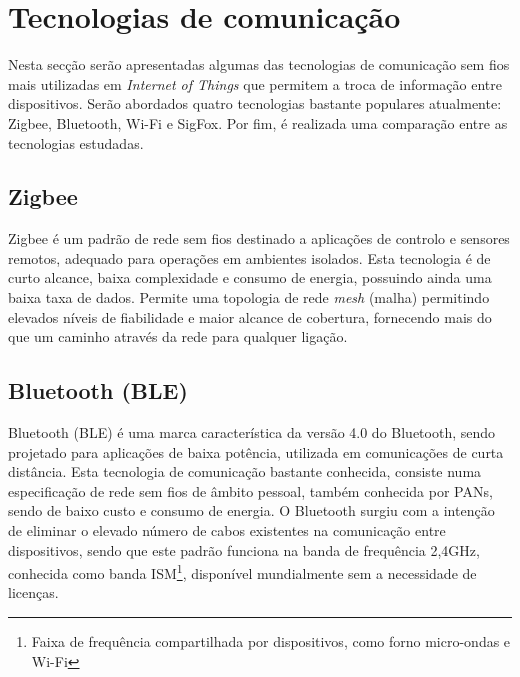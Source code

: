 \section{Tecnologias de comunicação}
\label{state-tecc}
Nesta secção serão apresentadas algumas das tecnologias de comunicação sem fios mais utilizadas em \textit{Internet of Things} que permitem a troca de informação entre dispositivos. Serão abordados quatro tecnologias bastante populares atualmente: Zigbee, Bluetooth, Wi-Fi e SigFox. Por fim, é realizada uma comparação entre as tecnologias estudadas. 



\subsection{Zigbee}


Zigbee é um padrão de rede sem fios destinado a aplicações de controlo e sensores remotos, adequado para operações em ambientes isolados. Esta tecnologia é de curto alcance, baixa complexidade e consumo de energia, possuindo ainda uma baixa taxa de dados. Permite uma topologia de rede \textit{mesh} (malha) permitindo elevados níveis de fiabilidade e maior alcance de cobertura, fornecendo mais do que um caminho através da rede para qualquer ligação\cite{Rahman2015}. 	




\subsection{Bluetooth (BLE)}


Bluetooth (BLE) é uma marca característica da versão 4.0 do Bluetooth, sendo projetado para aplicações de baixa potência, utilizada em comunicações de curta distância. Esta tecnologia de comunicação bastante conhecida, consiste numa especificação de rede sem fios de âmbito pessoal, também conhecida por \ac{PANs}, sendo de baixo custo e consumo de energia. O Bluetooth surgiu com a intenção de eliminar o elevado número de cabos existentes na comunicação entre dispositivos, sendo que este padrão funciona na banda de frequência 2,4GHz, conhecida como banda \ac{ISM}\footnote{Faixa de frequência compartilhada por dispositivos, como forno micro-ondas e Wi-Fi}, disponível mundialmente sem a necessidade de licenças\cite{Bruno2002}\cite{BluetoothTM2001}. 






